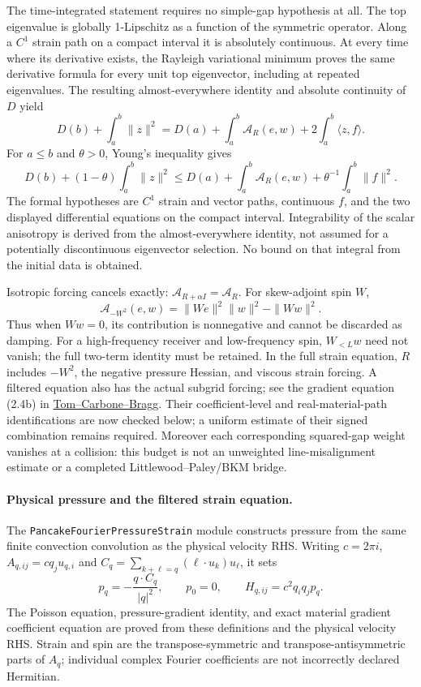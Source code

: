 \documentclass[11pt]{article}
\theoremstyle{definition}
\begin{document}
The time-integrated statement requires no simple-gap hypothesis at all.
The top eigenvalue is globally 1-Lipschitz as a function of the symmetric
operator. Along a $C^1$ strain path on a compact interval it is absolutely
continuous. At every time where its derivative exists, the Rayleigh
variational minimum proves the same derivative formula for every unit top
eigenvector, including at repeated eigenvalues. The resulting almost-everywhere
identity and absolute continuity of $D$ yield
\[
 D(b)+\int_a^b\|z\|^2
 =D(a)+\int_a^b\mathcal A_R(e,w)+2\int_a^b\langle z,f\rangle.
\]
For $a\le b$ and $\theta>0$, Young's inequality gives
\[
 D(b)+(1-\theta)\int_a^b\|z\|^2
 \le D(a)+\int_a^b\mathcal A_R(e,w)
       +\theta^{-1}\int_a^b\|f\|^2.
\]
The formal hypotheses are $C^1$ strain and vector paths, continuous $f$,
and the two displayed differential equations on the compact interval.
Integrability of the scalar anisotropy is derived from the almost-everywhere
identity, not assumed for a potentially discontinuous eigenvector selection.
No bound on that integral from the initial data is obtained.

Isotropic forcing cancels exactly:
$\mathcal A_{R+\alpha I}=\mathcal A_R$. For skew-adjoint spin $W$,
\[
 \mathcal A_{-W^2}(e,w)
 =\|We\|^2\|w\|^2-\|Ww\|^2.
\]
Thus when $Ww=0$, its contribution is nonnegative and cannot be discarded
as damping. For a high-frequency receiver and low-frequency spin,
$W_{<L}w$ need not vanish; the full two-term identity must be retained.
In the full strain equation, $R$ includes $-W^2$, the negative
pressure Hessian, and viscous strain forcing. A filtered equation also has
the actual subgrid forcing; see the gradient equation (2.4b) in
\href{https://arxiv.org/pdf/2005.04300v1}{Tom--Carbone--Bragg}.
Their coefficient-level and real-material-path identifications are now
checked below; a uniform estimate of their signed combination remains
required. Moreover each
corresponding squared-gap weight vanishes at a collision: this budget is not an unweighted
line-misalignment estimate or a completed Littlewood--Paley/BKM bridge.

\paragraph{Physical pressure and the filtered strain equation.}
The \texttt{PancakeFourierPressureStrain} module constructs pressure from
the same finite convection convolution as the physical velocity RHS.
Writing $c=2\pi i$, $A_{q,ij}=c q_j u_{q,i}$ and
$C_q=\sum_{k+\ell=q}(\ell\cdot u_k)u_\ell$, it sets
\[
 p_q=-\frac{q\cdot C_q}{|q|^2},\qquad p_0=0,\qquad
 H_{q,ij}=c^2q_iq_jp_q.
\]
The Poisson equation, pressure-gradient identity, and exact material
gradient coefficient equation are proved from these definitions and the
physical velocity RHS. Strain and spin are the transpose-symmetric and
transpose-antisymmetric parts of $A_q$; individual complex Fourier
coefficients are not incorrectly declared Hermitian.
\end{document}
